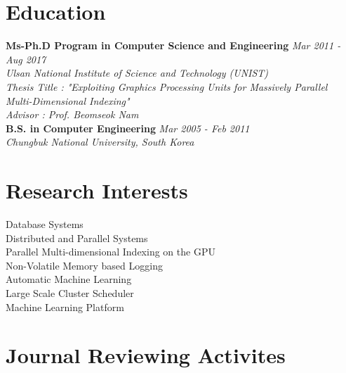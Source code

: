 \documentclass[margin,line]{res}
\begin{document}
\begin{resume}

\section{\sc Education}

{\bf Ms-Ph.D Program in Computer Science and Engineering} \hfill {\it Mar 2011 - Aug 2017 } \\
{\em Ulsan National Institute of Science and Technology (UNIST)}\\
{\em Thesis Title : "Exploiting Graphics Processing Units for Massively Parallel \\ Multi-Dimensional Indexing"} \\
\vspace{.2in}
{\em Advisor : Prof. Beomseok Nam} \\
{\bf B.S. in Computer Engineering} \hfill {\it Mar 2005 - Feb 2011 } \\
{\em Chungbuk National University, South Korea}
\vspace{.05in}

\section{\sc Research Interests}
Database Systems\\
Distributed and Parallel Systems \\
Parallel Multi-dimensional Indexing on the GPU\\
Non-Volatile Memory based Logging\\
Automatic Machine Learning\\
Large Scale Cluster Scheduler\\
Machine Learning Platform\\

\section{\sc Journal Reviewing Activites}

\begin{enumerate}


\end{enumerate}
\end{resume}
\end{document}
